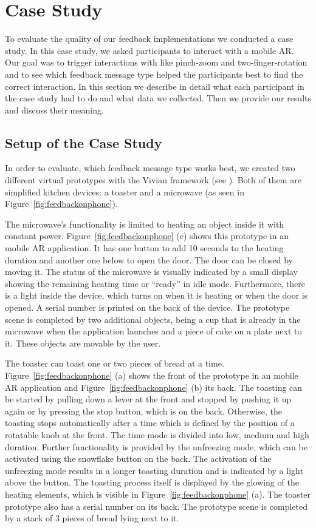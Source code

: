 \documentclass[manuscript]{acmart}
\begin{document}
	\section{Case Study}\label{sec:casestudy}
		To evaluate the quality of our feedback implementations we conducted a case study. In this case study, we asked participants to interact with a mobile AR. Our goal was to trigger interactions with like pinch-zoom and two-finger-rotation and to see which feedback message type helped the participants best to find the correct interaction. In this section we describe in detail what each participant in the case study had to do and what data we collected. Then we provide our results and discuss their meaning.
		
		\subsection{Setup of the Case Study}\label{ssec:setup}
			In order to evaluate, which feedback message type works best, we created two different virtual prototypes with the Vivian framework (see \emph{}). Both of them are simplified kitchen devices: a toaster and a microwave (as seen in Figure~\ref{fig:feedbackonphone}).

			The microwave's functionality is limited to heating an object inside it with constant power. Figure~\ref{fig:feedbackonphone} (c) shows this prototype in an mobile AR application. It has one button to add 10 seconds to the heating duration and another one below to open the door. The door can be closed by moving it. The status of the microwave is visually indicated by a small display showing the remaining heating time or ``ready'' in idle mode. Furthermore, there is a light inside the device, which turns on when it is heating or when the door is opened. A serial number is printed on the back of the device. The prototype scene is completed by two additional objects, being a cup that is already in the microwave when the application launches and a piece of cake on a plate next to it. These objects are movable by the user.

			The toaster can toast one or two pieces of bread at a time. Figure~\ref{fig:feedbackonphone} (a) shows the front of the prototype in an mobile AR application and Figure~\ref{fig:feedbackonphone} (b) its back. The toasting can be started by pulling down a lever at the front and stopped by pushing it up again or by pressing the stop button, which is on the back. Otherwise, the toasting stops automatically after a time which is defined by the position of a rotatable knob at the front. The time mode is divided into low, medium and high duration. Further functionality is provided by the unfreezing mode, which can be activated using the snowflake button on the back. The activation of the unfreezing mode results in a longer toasting duration and is indicated by a light above the button. The toasting process itself is displayed by the glowing of the heating elements, which is visible in Figure~\ref{fig:feedbackonphone} (a). The toaster prototype also has a serial number on its back. The prototype scene is completed by a stack of 3 pieces of bread lying next to it. 
			
\end{document}
